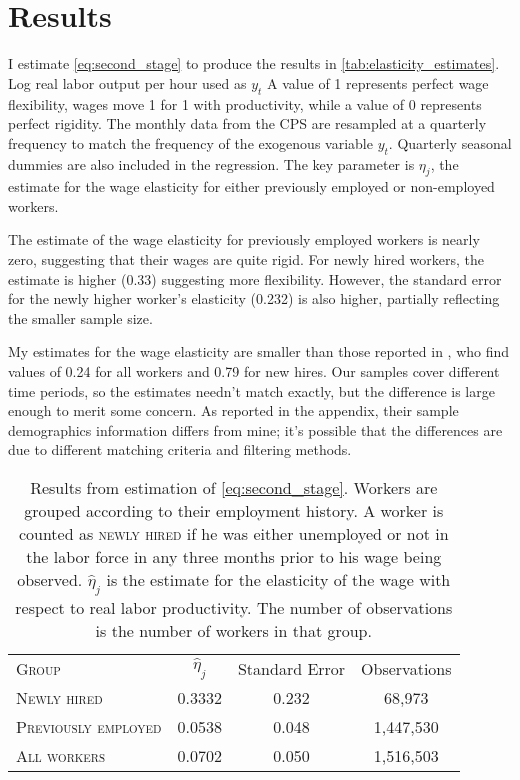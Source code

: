 \documentclass[11pt]{article}
\begin{document}
\section{Results}
\label{sec:results}

I estimate \autoref{eq:second_stage} to produce the results in \autoref{tab:elasticity_estimates}.
Log real labor output per hour used as $y_t$
A value of 1 represents perfect wage flexibility, wages move 1 for 1 with productivity, while a value of 0 represents perfect rigidity.
The monthly data from the CPS are resampled at a quarterly frequency to match the frequency of the exogenous variable $y_t$.
Quarterly seasonal dummies are also included in the regression.
The key parameter is $\eta_j$, the estimate for the wage elasticity for either previously employed or non-employed workers.

The estimate of the wage elasticity for previously employed workers is nearly zero, suggesting that their wages are quite rigid.
For newly hired workers, the estimate is higher (0.33) suggesting more flexibility.
However, the standard error for the newly higher worker's elasticity (0.232) is also higher, partially reflecting the smaller sample size.

My estimates for the wage elasticity are smaller than those reported in \cite{haefke_sonntag_vanRens_2013},  who find values of 0.24 for all workers and 0.79 for new hires.
Our samples cover different time periods, so the estimates needn't match exactly, but the difference is large enough to merit some concern.
As reported in the appendix, their sample demographics information differs from mine;
it's possible that the differences are due to different matching criteria and filtering methods.

\begin{table}
    \centering
    \begin{tabular}{lccc} \toprule
        \textsc{Group}               & $\hat{\eta}_j$ & Standard Error & Observations\\
        \textsc{Newly hired}         & 0.3332       & 0.232            & 68,973       \\
        \textsc{Previously employed} & 0.0538       & 0.048            & 1,447,530     \\
        \textsc{All workers}         & 0.0702       & 0.050            & 1,516,503     \\ \bottomrule
    \end{tabular}
    \caption{
                Results from estimation of \autoref{eq:second_stage}.
                Workers are grouped according to their employment history.
                A worker is counted as \textsc{newly hired} if he was either unemployed
                or not in the labor force in any three months prior to his wage
                being observed. $\hat{\eta}_j$ is the estimate for the elasticity of the wage with respect to real labor productivity.
                The number of observations is the number of workers in that group.
            }
    \label{tab:elasticity_estimates}
\end{table}
\end{document}
